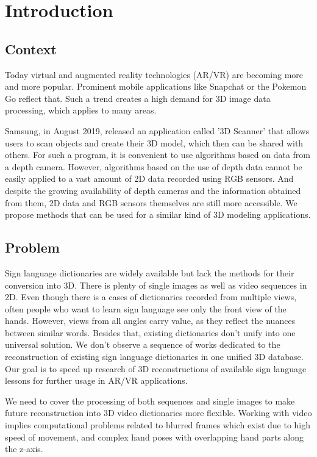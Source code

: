 \chapter{Introduction}

\minitoc

\section{Context}
Today virtual and augmented reality technologies (AR/VR) are becoming more and more popular. Prominent mobile applications like Snapchat or the Pokemon Go reflect that. Such a trend creates a high demand for 3D image data processing, which applies to many areas. 

Samsung, in August 2019, released an application called '3D Scanner' that allows users to scan objects and create their 3D model, which then can be shared with others. For such a program, it is convenient to use algorithms based on data from a depth camera. However, algorithms based on the use of depth data cannot be easily applied to a vast amount of 2D data recorded using RGB sensors. And despite the growing availability of depth cameras and the information obtained from them, 2D data and RGB sensors themselves are still more accessible. We propose methods that can be used for a similar kind of 3D modeling applications. 

\section{Problem}
Sign language dictionaries are widely available but lack the methods for their conversion into 3D. There is plenty of single images as well as video sequences in 2D. Even though there is a cases of dictionaries recorded from multiple views, often people who want to learn sign language see only the front view of the hands. However, views from all angles carry value, as they reflect the nuances between similar words. Besides that, existing dictionaries don't unify into one universal solution. We don't observe a sequence of works dedicated to the reconstruction of existing sign language dictionaries in one unified 3D database. Our goal is to speed up research of 3D reconstructions of available sign language lessons for further usage in AR/VR applications. 

We need to cover the processing of both sequences and single images to make future reconstruction into 3D video dictionaries more flexible. Working with video implies computational problems related to blurred frames which exist due to high speed of movement, and complex hand poses with overlapping hand parts along the z-axis.

